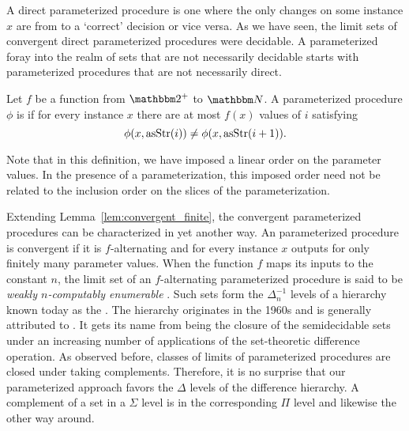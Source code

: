 A direct parameterized procedure is one where the only changes on some instance $x$ are from  to a `correct' decision or vice versa.
As we have seen, the limit sets of convergent direct parameterized procedures were decidable.
A parameterized foray into the realm of sets that are not necessarily decidable starts with parameterized procedures that are not necessarily direct.
\begin{definition}
  Let $f$ be a function from $\binary^+$ to $\bbN$.
  A parameterized procedure $\phi$ is  if for every instance $x$ there are at most $f(x)$ values of $i$ satisfying
  \begin{equation*}
    \phi(x, \operatorname{asStr}(i)) \neq \phi(x, \operatorname{asStr}(i + 1)).
  \end{equation*}
\end{definition}

Note that in this definition, we have imposed a linear order on the parameter values.
In the presence of a parameterization, this imposed order need not be related to the inclusion order on the slices of the parameterization.

Extending Lemma~\ref{lem:convergent_finite}, the convergent parameterized procedures can be characterized in yet another way.
An parameterized procedure is convergent if it is $f$-alternating and for every instance $x$ outputs  for only finitely many parameter values.
When the function $f$ maps its inputs to the constant $n$, the limit set of an $f$-alternating parameterized procedure is said to be \emph{weakly $n$-computably enumerable} \parencite{odifreddi1992classical,epstein1981hierarchies}.
Such sets form the $\Delta^{-1}_n$ levels of a hierarchy known today as the  \parencite{downey2010algorithmic}.
The hierarchy originates in the 1960s \parencite{putnam1965trial,gold1965limiting,ershov1968hierarchyi} and is generally attributed to \citeauthor{ershov1968hierarchyi}.
It gets its name from being the closure of the semidecidable sets under an increasing number of applications of the set-theoretic difference operation.
As observed before, classes of limits of parameterized procedures are closed under taking complements.
Therefore, it is no surprise that our parameterized approach favors the $\Delta$ levels of the difference hierarchy.
A complement of a set in a $\Sigma$ level is in the corresponding $\Pi$ level and likewise the other way around.


